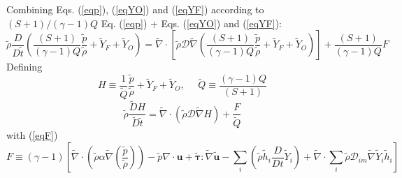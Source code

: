 \documentclass[preprint,12pt,authoryear]{elsarticle}
\begin{document}
{\color{red}
Combining Eqs. (\ref{eqp}), (\ref{eqYO}) and (\ref{eqYF}) according to $(S+1)/(\gamma -1)Q$ Eq. (\ref{eqp}) + Eqs. (\ref{eqYO}) and (\ref{eqYF}):
%
\begin{equation}
	\tilde{\rho} \frac{D  }{D \tilde{t}}
	\left(
	\frac{(S+1)}{(\gamma-1)Q} \frac{ \tilde{p}}{ \tilde{\rho}} 
	+ \tilde{Y}_F + \tilde{Y}_O
	\right)
= 
	\tilde{\nabla}\cdot \left[ \tilde{\rho} \mathcal{D}
	\tilde{\nabla}
	\left(
	\frac{(S+1)}{(\gamma-1)Q} \frac{ \tilde{p}}{ \tilde{\rho}} 
	+ \tilde{Y}_F + \tilde{Y}_O
	\right)
	\right]
	+
	\frac{(S+1)}{(\gamma-1)Q} F
\end{equation}
Defining
\[
  H \equiv 
    \frac{1}{\tilde{Q}} 
    \frac{ \tilde{p}}{ \tilde{\rho}} + \tilde{Y}_F + \tilde{Y}_O,
    \ \ \ \ \ \ 
    \tilde{Q} \equiv 	\frac{(\gamma-1)Q}{(S+1)}
\]
\begin{equation}
	\tilde{\rho} \frac{\tilde{D}  H}{\tilde{D} \tilde{t}}
= 
	\tilde{\nabla}\cdot 
	\left( \tilde{\rho} \mathcal{D} \tilde{\nabla} H \right)
	+
	\frac{F}{\tilde{Q}}
\end{equation}
with (\ref{eqF})
\[
    F \equiv 
            (\gamma - 1)
        \left[
        \tilde{\nabla} \cdot 
		\left( 
		\tilde{\rho} \alpha
		\tilde{\nabla} (\frac{ \tilde{p} }{  \tilde{\rho} } )
		\right)
        -
        \tilde{p}  \nabla \cdot \mathbf{u}
		 +
        \pmb{\tilde{\tau}}:\tilde{\nabla} \pmb{\tilde{u}} 
        -
        \sum\limits_i
        \left(
                 \tilde{\rho}\tilde{h}_i
                \frac{D}{Dt}
		\tilde{Y}_i
		\right)
        +
        \tilde{\nabla} \cdot
        \sum\limits_i 
        \tilde{\rho}\mathcal{D}_{im}\tilde{\nabla}\tilde{Y}_i     
        \tilde{h}_i
        \right]
\]
}
\end{document}
